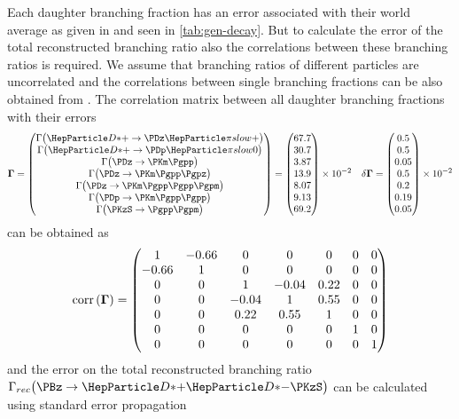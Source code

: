 \documentclass[a4paper]{report}
\begin{document}
Each daughter branching fraction has an error associated with their world
average as given in \cite{PDG} and seen in \ref{tab:gen-decay}. But to
calculate the error of the total reconstructed branching ratio also the
correlations between these branching ratios is required. We assume that
branching ratios of different particles are uncorrelated and the correlations
between single branching fractions can be also obtained from \cite{PDG}.
The correlation matrix between all daughter branching fractions with their
errors
\begin{equation}
    \mathbf{\BR} = \begin{pmatrix}
    \BR\big(\PDstp \rightarrow \PDz\Pgpps\big)\\
    \BR\big(\PDstp \rightarrow \PDp\Pgpzs\big)\\
    \BR\big(\PDz   \rightarrow \PKm\Pgpp\big)\\
    \BR\big(\PDz   \rightarrow \PKm\Pgpp\Pgpz\big)\\
    \BR\big(\PDz   \rightarrow \PKm\Pgpp\Pgpp\Pgpm\big)\\
    \BR\big(\PDp   \rightarrow \PKm\Pgpp\Pgpp\big)\\
    \BR\big(\PKzS  \rightarrow \Pgpp\Pgpm\big)
\end{pmatrix} =
\begin{pmatrix}
    67.7\\ 30.7\\ 3.87\\ 13.9\\
    8.07\\ 9.13\\ 69.2
\end{pmatrix} \times 10^{-2}
\quad \delta \mathbf{\BR} =
\begin{pmatrix}
    0.5\\ 0.5\\ 0.05\\   0.5\\
    0.2\\ 0.19\\ 0.05
\end{pmatrix} \times 10^{-2}
    \label{eq:br-list}
\end{equation}
can be obtained as
\begin{equation}
    \text{corr}\left(\mathbf{\Gamma}\right) = \begin{pmatrix}
        1 & -0.66 & 0 & 0 & 0 & 0 & 0\\
        -0.66 & 1 & 0 & 0 & 0 & 0 & 0\\
        0 & 0 & 1 & -0.04 & 0.22 & 0 & 0\\
        0 & 0 & -0.04 & 1 & 0.55 & 0 & 0\\
        0 & 0 & 0.22 & 0.55 & 1 & 0 & 0\\
        0 & 0 & 0 & 0 & 0 & 1 & 0\\
        0 & 0 & 0 & 0 & 0 & 0 & 1
    \end{pmatrix}
    \label{eq:br-correlations}
\end{equation}
and the error on the total reconstructed branching ratio
$\BR_{rec}\big(\ddk\big)$ can be calculated using standard error propagation
\cite{errorprop}
\end{document}
